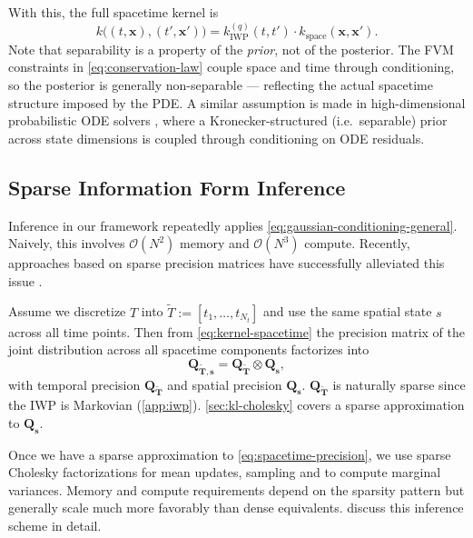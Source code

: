\documentclass{article}
\theoremstyle{plain}
\theoremstyle{definition}
\theoremstyle{remark}
\begin{document}
With this, the full spacetime kernel is
\begin{equation}
  k\bigl((t, \bm{x}), (t', \bm{x}')\bigr) = k_{\text{IWP}}^{(q)}(t, t') \cdot k_{\text{space}}(\bm{x}, \bm{x}').
  \label{eq:kernel-spacetime}
\end{equation}
Note that separability is a property of the \emph{prior}, not of the posterior.
The FVM constraints in \cref{eq:conservation-law} couple space and time through conditioning, so the posterior is generally non-separable --- reflecting the actual spacetime structure imposed by the PDE.
A similar assumption is made in high-dimensional probabilistic ODE solvers \citep{kramerProbabilisticODESolutions2022}, where a Kronecker-structured (i.e.\ separable) prior across state dimensions is coupled through conditioning on ODE residuals.

\subsection{Sparse Information Form Inference}
\label{sec:sparse-information}

Inference in our framework repeatedly applies \cref{eq:gaussian-conditioning-general}.
Naively, this involves $\mathcal{O}(N^2)$ memory and $\mathcal{O}(N^3)$ compute.
Recently, approaches based on sparse precision matrices have successfully alleviated this issue \citep{chenSparseCholeskyFactorization2025, weilandFlexibleEfficientProbabilistic2025a}.

Assume we discretize $T$ into $\tilde{T} := [t_1, \dots, t_{N_t}]$ and use the same spatial state $s$ across all time points.
Then from \cref{eq:kernel-spacetime} the precision matrix of the joint distribution across all spacetime components factorizes into
\begin{equation}
  \bm{Q_{\tilde{T}, s}} = \bm{Q_{\tilde{T}}} \otimes \bm{Q_{s}},
  \label{eq:spacetime-precision}
\end{equation}
with temporal precision $\bm{Q_{\tilde{T}}}$ and spatial precision $\bm{Q_s}$.
$\bm{Q_{\tilde{T}}}$ is naturally sparse since the IWP is Markovian (\cref{app:iwp}).
\cref{sec:kl-cholesky} covers a sparse approximation to $\bm{Q_s}$.

Once we have a sparse approximation to \cref{eq:spacetime-precision}, we use sparse Cholesky factorizations for mean updates, sampling and to compute marginal variances.
Memory and compute requirements depend on the sparsity pattern but generally scale much more favorably than dense equivalents.
\citet{weilandFlexibleEfficientProbabilistic2025a} discuss this inference scheme in detail.
\end{document}

